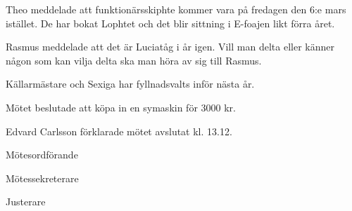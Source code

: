\documentclass[10pt]{article}
\def\mo{Edvard Carlsson}
\def\ms{Mattias Lundström}
\def\ji{Henrik Ramström}
\begin{document}
\begin{paragrafer}
Theo meddelade att funktionärsskiphte kommer vara på fredagen den 6:e mars istället. De har bokat Lophtet och det blir sittning i E-foajen likt förra året.   

Rasmus meddelade att det är Luciatåg i år igen. Vill man delta eller känner någon som kan vilja delta ska man höra av sig till Rasmus. 


Källarmästare och Sexiga har fyllnadsvalts inför nästa år. 

Mötet beslutade att köpa in en symaskin för 3000 kr. 

{\mo} förklarade mötet avslutat kl. 13.12. 
\end{paragrafer}

\hidesignfoot
\begin{signatures}{3}
\signature{\mo}{Mötesordförande}
\signature{\ms}{Mötessekreterare}
\signature{\ji}{Justerare}
\end{signatures}
\end{document}
